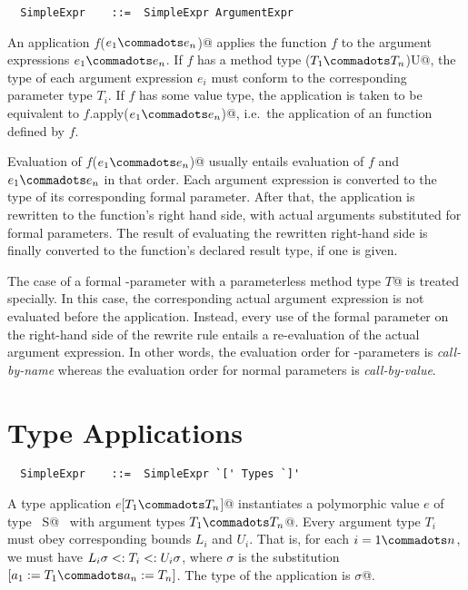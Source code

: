 \documentclass[a4paper,12pt,twoside,titlepage]{book}
\begin{document}
\syntax\begin{lstlisting}
  SimpleExpr    ::=  SimpleExpr ArgumentExpr
\end{lstlisting}

An application \lstinline@$f$($e_1 \commadots e_n$)@ applies the function $f$ to the
argument expressions $e_1 \commadots e_n$. If $f$ has a method type
\lstinline@($T_1 \commadots T_n$)U@, the type of each argument
expression $e_i$ must conform to the corresponding parameter type
$T_i$. If $f$ has some value type, the application is taken to be
equivalent to \lstinline@$f$.apply($e_1 \commadots e_n$)@, i.e.\ the
application of an  function defined by $f$.


Evaluation of \lstinline@$f$($e_1 \commadots e_n$)@ usually entails evaluation of
$f$ and $e_1 \commadots e_n$ in that order. Each argument expression
is converted to the type of its corresponding formal parameter.  After
that, the application is rewritten to the function's right hand side,
with actual arguments substituted for formal parameters.  The result
of evaluating the rewritten right-hand side is finally converted to
the function's declared result type, if one is given.

The case of a formal -parameter with a parameterless
method type \lstinline@[]$T$@ is treated specially. In this case, the
corresponding actual argument expression is not evaluated before the
application. Instead, every use of the formal parameter on the
right-hand side of the rewrite rule entails a re-evaluation of the
actual argument expression. In other words, the evaluation order for
-parameters is {\em call-by-name} whereas the evaluation
order for normal parameters is {\em call-by-value}.

\section{Type Applications}
\label{sec:type-app}
\syntax\begin{lstlisting}
  SimpleExpr    ::=  SimpleExpr `[' Types `]'
\end{lstlisting}

A type application \lstinline@$e$[$T_1 \commadots T_n$]@ instantiates a
polymorphic value $e$ of type
~\lstinline@[$a_1$ >: $L_1$ <: $U_1 \commadots a_n$ >: $L_n$ <: $U_n$]S@~ with
argument types \lstinline@$T_1 \commadots T_n$@.  Every argument type
$T_i$ must obey corresponding bounds $L_i$ and
$U_i$.  That is, for each $i = 1 \commadots n$, we must
have $L_i \sigma <: T_i <: U_i \sigma$, where $\sigma$ is the
substitution $[a_1 := T_1 \commadots a_n := T_n]$.  The type
of the application is \lstinline@S$\sigma$@.  
\end{document}
